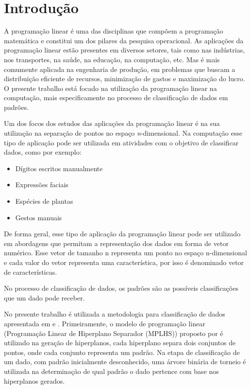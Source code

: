 \chapter{Introdução}

A programação linear é uma das disciplinas que compõem a programação matemática e constitui um dos pilares da pesquisa operacional. As aplicações da programação linear estão presentes em diversos setores, tais como nas indústrias, nos transportes, na saúde, na educação, na computação, etc. Mas é mais comumente aplicada na engenharia de produção, em problemas que buscam a distribuição eficiente de recursos, minimização de gastos e maximização do lucro. O presente trabalho está focado na utilização da programação linear na computação, mais especificamente no processo de classificação de dados em padrões. 

Um dos focos dos estudos das aplicações da programação linear é na sua utilização na separação de pontos no espaço \textit{n}-dimensional. Na computação esse tipo de aplicação pode ser utilizada em atividades com o objetivo de classificar dados, como por exemplo:

\begin{itemize}
\item Dígitos escritos manualmente 
\item Expressões faciais
\item Espécies de plantas
\item Gestos manuais
\end{itemize}

De forma geral, esse tipo de aplicação da programação linear pode ser utilizado em abordagens que permitam a representação dos dados em forma de vetor numérico. Esse vetor de tamanho n representa um ponto no espaço n-dimensional e cada valor do vetor representa uma característica, por isso é denominado vetor de características.

No processo de classificação de dados, os padrões são as possíveis classificações que um dado pode receber. 

No presente trabalho é utilizada a metodologia para classificação de dados apresentada em  e . Primeiramente, o modelo de programação linear (Programação Linear de Hiperplano Separador (MPLHS)) proposto por  é utilizado na geração de hiperplanos, cada hiperplano separa dois conjuntos de pontos, onde cada conjunto representa um padrão. Na etapa de classificação de um dado, com padrão inicialmente desconhecido, uma árvore binária de torneio é utilizada na determinação de qual padrão o dado pertence com base nos hiperplanos gerados.

